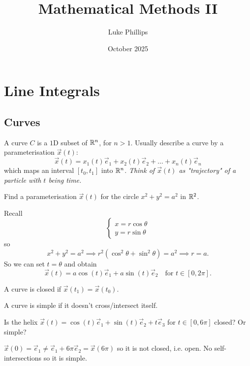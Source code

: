 \documentclass[10pt, a4paper]{article}
\title{Mathematical Methods II}
\author{Luke Phillips}
\date{October 2025}
\begin{document}
\maketitle

\newpage

\tableofcontents

\newpage

\section{Line Integrals}

\subsection{Curves}

A curve $C$ is a $1$D subset of $\mathbb{R} ^ n$,
for $n > 1$.
Usually describe a curve by a parameterisation $\vec{x}(t)$:
\[
\vec{x}(t) = x_1(t)\vec{e}_1 + x_2(t)\vec{e}_2 + \dotsc + x_n(t)\vec{e}_n
\]
which maps an interval $[t_0, t_1]$ into $\mathbb{R} ^ n$.
\textit{Think of $\vec{x}(t)$ as "trajectory" of a particle with $t$ being time.}

\begin{example}
    Find a parameterisation $\vec{x}(t)$ for the circle $x ^ 2 + y ^ 2 = a ^ 2$ in $\mathbb{R} ^ 2$.

    \begin{solution}
        Recall
        \[
        \begin{cases}
            x = r\cos{\theta} \\
            y = r\sin{\theta}
        \end{cases}
        \]
        so
        \[
        x ^ 2 + y ^ 2 = a ^ 2 \implies r ^ 2(\cos ^ 2{\theta} + \sin ^ 2{\theta}) = a ^ 2 \implies r = a.
        \]
        So we can set $t = \theta$ and obtain
        \[
        \vec{x}(t) = a\cos(t)\vec{e}_1 + a\sin(t)\vec{e}_2\quad\text{for } t \in [0, 2\pi].
        \]
    \end{solution}
\end{example}

A curve is closed if $\vec{x}(t_1) = \vec{x}(t_0)$.

A curve is simple if it doesn't cross/intersect itself.

\begin{example}
    Is the helix $\vec{x}(t) = \cos(t)\vec{e}_1 + \sin(t)\vec{e}_2 + t\vec{e}_3$ for $t \in [0, 6\pi]$ closed?
    Or simple?

    \begin{solution}
        $\vec{x}(0) = \vec{e}_1 \neq \vec{e}_1 + 6\pi\vec{e}_2 = \vec{x}(6\pi)$ so it is not closed,
        i.e. open.
        No self-intersections so it is simple.
    \end{solution}
\end{example}
\end{document}
